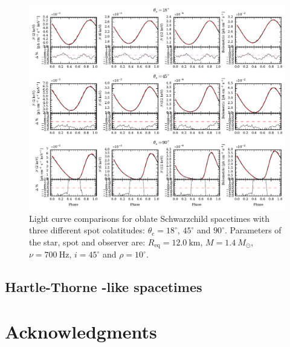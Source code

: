 \documentclass[iop, usenatbib]{emulateapj}
\newcommand{\Msun}{\ensuremath{M_{\odot}}}
\begin{document}
\begin{figure}
\centering
\includegraphics[width=18cm]{figs/fig4.pdf}
\caption{\label{fig:sch_comp400}
  Light curve comparisons for oblate Schwarzchild spacetimes with three different spot colatitudes: $\theta_{\mathrm{c}} = 18^{\circ}$, $45^{\circ}$ and $90^{\circ}$.
  Parameters of the star, spot and observer are: $R_{\mathrm{eq}} = 12.0~\mathrm{km}$, $M = 1.4~\Msun$, $\nu = 700~\mathrm{Hz}$, $i = 45^{\circ}$ and $\rho = 10^{\circ}$.
  }
\end{figure}



\subsection{Hartle-Thorne -like spacetimes}





\section*{Acknowledgments}
\end{document}
